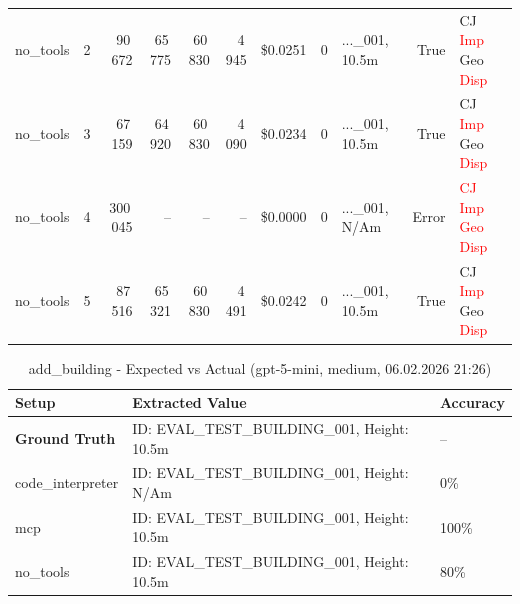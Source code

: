 \documentclass[a4paper,11pt]{article}
\begin{document}
\begin{table}[H]
{\begin{tabular}{l r r r r r r r l r l}
no\_tools & 2 & 90\,672 & 65\,775 & 60\,830 & 4\,945 & \$0.0251 & 0 & ...\_001, 10.5m & True & CJ \textcolor{red}{Imp} Geo \textcolor{red}{Disp} \\
no\_tools & 3 & 67\,159 & 64\,920 & 60\,830 & 4\,090 & \$0.0234 & 0 & ...\_001, 10.5m & True & CJ \textcolor{red}{Imp} Geo \textcolor{red}{Disp} \\
no\_tools & 4 & 300\,045 & -- & -- & -- & \$0.0000 & 0 & ...\_001, N/Am & Error & \textcolor{red}{CJ} \textcolor{red}{Imp} \textcolor{red}{Geo} \textcolor{red}{Disp} \\
no\_tools & 5 & 87\,516 & 65\,321 & 60\,830 & 4\,491 & \$0.0242 & 0 & ...\_001, 10.5m & True & CJ \textcolor{red}{Imp} Geo \textcolor{red}{Disp} \\
\bottomrule
\end{tabular}}
\end{table}

\begin{table}[H]
\centering
\scriptsize
\caption{add\_building - Expected vs Actual (gpt-5-mini, medium, 06.02.2026 21:26)}
\begin{tabular}{l l l}
\toprule
Setup & Extracted Value & Accuracy \\
\midrule
\textbf{Ground Truth} & ID: EVAL\_TEST\_BUILDING\_001, Height: 10.5m & -- \\
\midrule
code\_interpreter & ID: EVAL\_TEST\_BUILDING\_001, Height: N/Am & 0\% \\
mcp & ID: EVAL\_TEST\_BUILDING\_001, Height: 10.5m & 100\% \\
no\_tools & ID: EVAL\_TEST\_BUILDING\_001, Height: 10.5m & 80\% \\
\bottomrule
\end{tabular}
\end{table}

\clearpage
\end{document}
